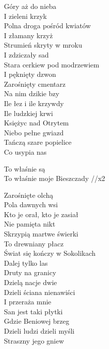 \begin{text}
    Góry aż do nieba\\
    I zieleni krzyk\\
    Polna droga pośród kwiatów\\
    I złamany krzyż\\
    Strumień skryty w mroku\\
    I zdziczały sad\\
    Stara cerkiew pod modrzewiem\\
    I pęknięty dzwon\\
    Zarośnięty cmentarz\\
    Na nim dzikie bzy\\
    Ile łez i ile krzywdy\\
    Ile ludzkiej krwi\\
    Księżyc nad Otrytem\\
    Niebo pełne gwiazd\\
    Tańczą szare popielice\\
    Co usypia nas

    \vin To właśnie są\\
    \vin To właśnie moje Bieszczady //x2

    Zarośnięte olchą\\
    Pola dawnych wsi\\
    Kto je orał, kto je zasiał\\
    Nie pamięta nikt\\
    Skrzypią martwe świerki\\
    To drewniany płacz\\
    Świat się kończy w Sokolikach\\
    Dalej tylko las\\
    Druty na granicy\\
    Dzielą nacje dwie\\
    Dzieli ściana nienawiści\\
    I przeraża mnie\\
    San jest taki płytki\\
    Gdzie Beniowej brzeg\\
    Dzieli ludzi dzieli myśli\\
    Straszny jego gniew    
\end{text}
